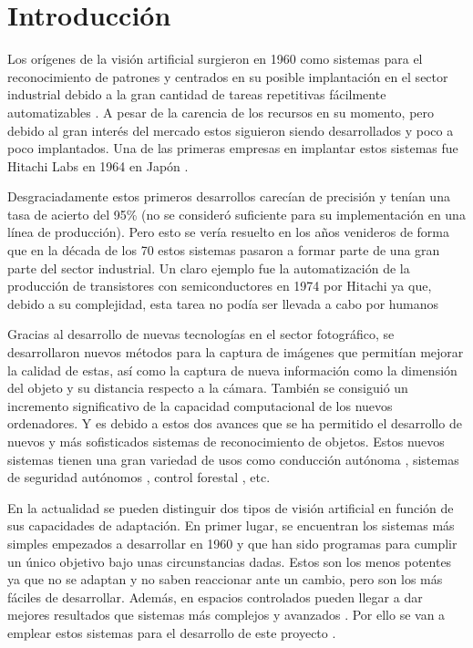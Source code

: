 \chapter{Introducción}
\label{chap:Introduction}


Los orígenes de la visión artificial surgieron en 1960 como sistemas para el reconocimiento de patrones y centrados en su posible implantación en el sector industrial debido a la gran cantidad de tareas repetitivas fácilmente automatizables \citep{50years}. A pesar de la carencia de los recursos en su momento, pero debido al gran interés del mercado estos siguieron siendo desarrollados y poco a poco implantados. Una de las primeras empresas en implantar estos sistemas fue Hitachi Labs en 1964 en Japón \cite{50years}.

Desgraciadamente estos primeros desarrollos carecían de precisión y tenían una tasa de acierto del 95\% (no se consideró suficiente para su implementación en una línea de producción). Pero esto se vería resuelto en los años venideros de forma que en la década de los 70 estos sistemas pasaron a formar parte de una gran parte del sector industrial. Un claro ejemplo fue la automatización de la producción de transistores con semiconductores en 1974 por Hitachi ya que, debido a su complejidad, esta tarea no podía ser llevada a cabo por humanos \cite{hitachi}

Gracias al desarrollo de nuevas tecnologías en el sector fotográfico, se desarrollaron nuevos métodos para la captura de imágenes que permitían mejorar la calidad de estas, así como la captura de nueva información como la dimensión del objeto y su distancia respecto a la cámara. También se consiguió un incremento significativo de la capacidad computacional de los nuevos ordenadores. Y es debido a estos dos avances que se ha permitido el desarrollo de nuevos y más sofisticados sistemas de reconocimiento de objetos. Estos nuevos sistemas tienen una gran variedad de usos como conducción autónoma \cite{AIvehicle}, sistemas de seguridad autónomos \cite{AIsecurity}, control forestal \cite{AIdrones}, etc.

En la actualidad se pueden distinguir dos tipos de visión artificial en función de sus capacidades de adaptación. En primer lugar, se encuentran los sistemas más simples empezados a desarrollar en 1960 y que han sido programas para cumplir un único objetivo bajo unas circunstancias dadas. Estos son los menos potentes ya que no se adaptan y no saben reaccionar ante un cambio, pero son los más fáciles de desarrollar. Además, en espacios controlados pueden llegar a dar mejores resultados que sistemas más complejos y avanzados \cite{ABB}. Por ello se van a emplear estos sistemas para el desarrollo de este proyecto \cite{industry4}.

